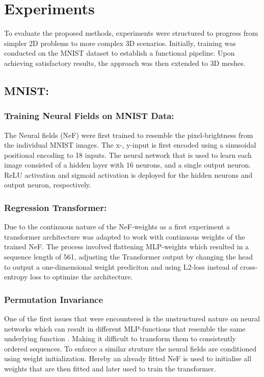 \section{Experiments}
\label{sec:exper}
To evaluate the proposed methods, experiments were structured to progress from simpler 2D problems to more complex 3D scenarios. Initially, training was conducted on the MNIST dataset to establish a functional pipeline. Upon achieving satisfactory results, the approach was then extended to 3D meshes.

\subsection*{MNIST: }
\subsubsection*{Training Neural Fields on MNIST Data: }
The Neural fields (NeF) were first trained to resemble the pixel-brightness from the individual MNIST images. The x-, y-input is first encoded using a sinusoidal positional encoding to 18 inputs. The neural network that is used to learn each image consisted of a hidden layer with 16 neurons, and a single output neuron. ReLU activation and sigmoid activation is deployed for the hidden neurons and output neuron, respectively.

\subsubsection*{Regression Transformer: }
Due to the continuous nature of the NeF-weights as a first experiment a transformer architecture was adapted to work with continuous weights of the trained NeF. The process involved flattening MLP-weights which resulted in a sequence length of 561, adjusting the Transformer output by changing the head to output a one-dimensional weight prediciton and using L2-loss instead of cross-entropy loss to optimize the architecture.

\subsubsection*{Permutation Invariance}
One of the first issues that were encountered is the unstructured nature on neural networks which can result in different MLP-functions that resemble the same underlying function \cite{HechtNielsen1990ONTA}. Making it difficult to transform them to consistently ordered sequences. To enforce a similar struture the neural fields are conditioned using weight initialization. Hereby an already fitted NeF is used to initialise all weights that are then fitted and later used to train the transformer.

